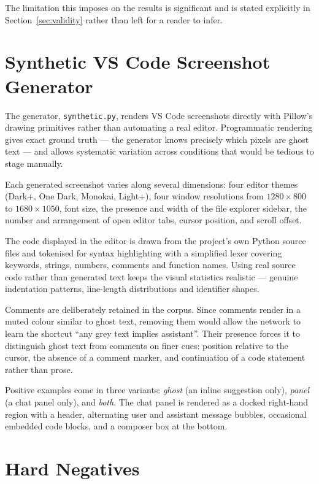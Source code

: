 \documentclass[12pt,oneside]{report}
\newcommand{\code}[1]{\texttt{\small #1}}
\begin{document}
The limitation this imposes on the results is significant and is stated
explicitly in Section~\ref{sec:validity} rather than left for a reader to
infer.

\section{Synthetic VS Code Screenshot Generator}
\label{sec:generator}

The generator, \code{synthetic.py}, renders VS Code screenshots directly with
Pillow's drawing primitives rather than automating a real editor. Programmatic
rendering gives exact ground truth --- the generator knows precisely which
pixels are ghost text --- and allows systematic variation across conditions
that would be tedious to stage manually.

Each generated screenshot varies along several dimensions: four editor themes
(Dark+, One Dark, Monokai, Light+), four window resolutions from
$1280\times800$ to $1680\times1050$, font size, the presence and width of the
file explorer sidebar, the number and arrangement of open editor tabs, cursor
position, and scroll offset.

The code displayed in the editor is drawn from the project's own Python source
files and tokenised for syntax highlighting with a simplified lexer covering
keywords, strings, numbers, comments and function names. Using real source code
rather than generated text keeps the visual statistics realistic --- genuine
indentation patterns, line-length distributions and identifier shapes.

Comments are deliberately retained in the corpus. Since comments render in a
muted colour similar to ghost text, removing them would allow the network to
learn the shortcut ``any grey text implies assistant''. Their presence forces
it to distinguish ghost text from comments on finer cues: position relative to
the cursor, the absence of a comment marker, and continuation of a code
statement rather than prose.

Positive examples come in three variants: \emph{ghost} (an inline suggestion
only), \emph{panel} (a chat panel only), and \emph{both}. The chat panel is
rendered as a docked right-hand region with a header, alternating user and
assistant message bubbles, occasional embedded code blocks, and a composer box
at the bottom.

\section{Hard Negatives}
\label{sec:hardneg}
\end{document}
